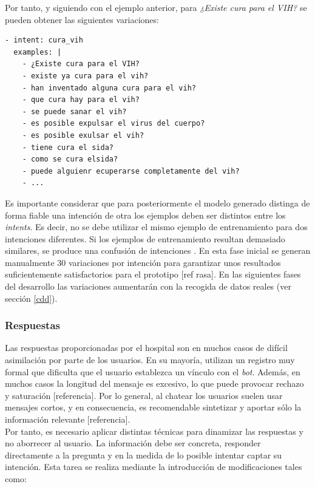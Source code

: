 Por tanto, y siguiendo con el ejemplo anterior, para \textit{¿Existe cura para el VIH?} se pueden obtener las siguientes variaciones:

\begin{verbatim}
- intent: cura_vih
  examples: |
    - ¿Existe cura para el VIH?
    - existe ya cura para el vih?
    - han inventado alguna cura para el vih?
    - que cura hay para el vih?
    - se puede sanar el vih?
    - es posible expulsar el virus del cuerpo?
    - es posible exulsar el vih?
    - tiene cura el sida?
    - como se cura elsida?
    - puede alguienr ecuperarse completamente del vih?
    - ...
\end{verbatim}

Es importante considerar que para posteriormente el modelo generado distinga de forma fiable una intención de otra los ejemplos deben ser distintos entre los \textit{intents}. Es decir, no se debe utilizar el mismo ejemplo de entrenamiento para dos intenciones diferentes. Si los ejemplos de entrenamiento resultan demasiado similares, se produce una confusión de intenciones \cite{bestPracticesNLU}. En esta fase inicial se generan manualmente 30 variaciones por intención para garantizar unos resultados suficientemente satisfactorios para el prototipo [ref rasa]. En las siguientes fases del desarrollo las variaciones aumentarán con la recogida de datos reales (ver sección \ref{cdd}).

\subsubsection{Respuestas}
Las respuestas proporcionadas por el hospital son en muchos casos de difícil asimilación por parte de los usuarios. En su mayoría, utilizan un registro muy formal que dificulta que el usuario establezca un vínculo con el \textit{bot}. Además, en muchos casos la longitud del mensaje es excesivo, lo que puede provocar rechazo y saturación [referencia]. Por lo general, al chatear los usuarios suelen usar mensajes cortos, y en consecuencia, es recomendable sintetizar y aportar sólo la información relevante [referencia].\\

Por tanto, es necesario aplicar distintas técnicas para dinamizar las respuestas y no aborrecer al usuario. La información debe ser concreta, responder directamente a la pregunta y en la medida de lo posible intentar captar su intención. Esta tarea se realiza mediante la introducción de modificaciones tales como:

